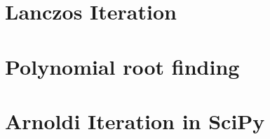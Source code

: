 \section*{Lanczos Iteration}



\section*{Polynomial root finding}



\section*{Arnoldi Iteration in SciPy}






